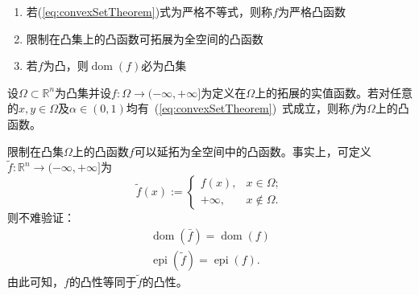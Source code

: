 \begin{remark}
    \begin{enumerate}
        \item 若(\ref{eq:convexSetTheorem})式为严格不等式，则称$f$为严格凸函数
        \item 限制在凸集上的凸函数可拓展为全空间的凸函数
        \item 若$f$为凸，则$\operatorname{dom}(f)$必为凸集
    \end{enumerate}
\end{remark}

\begin{definition}
    设$\Omega\subset \mathbb{R}^n$为凸集并设$f:\Omega\to(-\infty,+\infty]$为定义在$\Omega$上的拓展的实值函数。若对任意的$x,y\in\Omega$及$\alpha\in(0,1)$均有~(\ref{eq:convexSetTheorem})~式成立，则称$f$为$\Omega$上的凸函数。
\end{definition}

限制在凸集$\Omega$上的凸函数$f$可以延拓为全空间中的凸函数。事实上，可定义$\tilde{f}:\mathbb{R}^n\to (-\infty,+\infty]$为
\[
    \left.\tilde{f}(x):=\left\{
        \begin{array}{ll}
            f(x),&x\in\Omega;\\
            +\infty,&x\notin\Omega.
        \end{array}
        \right.\right.
\]
则不难验证：
\[
    \begin{gathered}
        \operatorname{dom}({\bar{f}}) =\operatorname{dom}(f) \\
        \operatorname{epi}(\tilde{f}) =\operatorname{epi}(f). 
    \end{gathered}
\]
由此可知，$f$的凸性等同于$\tilde{f}$的凸性。

